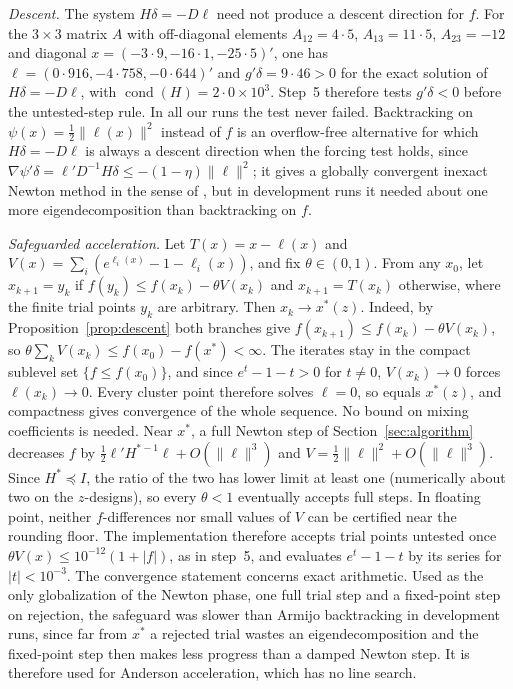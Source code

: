 \documentclass[11pt]{article}
\begin{document}
\emph{Descent.} The system $H\delta=-D\ell$ need not produce a
descent direction for $f$. For the $3\times3$ matrix $A$ with
off-diagonal elements $A_{12}=4{\cdot}5$, $A_{13}=11{\cdot}5$,
$A_{23}=-12$ and diagonal $x=(-3{\cdot}9,-16{\cdot}1,-25{\cdot}5)'$, one
has $\ell=(0{\cdot}916,-4{\cdot}758,-0{\cdot}644)'$ and
$g'\delta=9{\cdot}46>0$ for the exact solution of $H\delta=-D\ell$,
with $\operatorname{cond}(H)=2{\cdot}0\times10^{3}$. Step~5 therefore
tests $g'\delta<0$ before the untested-step rule. In all our runs the
test never failed. Backtracking on $\psi(x)=\tfrac12\|\ell(x)\|^{2}$
instead of $f$ is an overflow-free alternative for which
$H\delta=-D\ell$ is always a descent direction when the forcing test
holds, since $\nabla\psi'\delta=\ell'D^{-1}H\delta\leq-(1-\eta)\|\ell\|^{2}$;
it gives a globally convergent inexact Newton method in the sense of
\citet{EisenstatWalker:1994}, but in development runs it needed about
one more eigendecomposition than backtracking on $f$.

\emph{Safeguarded acceleration.} Let $T(x)=x-\ell(x)$ and
$V(x)=\sum_i(e^{\ell_i(x)}-1-\ell_i(x))$, and fix $\theta\in(0,1)$.
From any $x_0$, let $x_{k+1}=y_k$ if $f(y_k)\leq f(x_k)-\theta V(x_k)$
and $x_{k+1}=T(x_k)$ otherwise, where the finite trial points $y_k$
are arbitrary. Then $x_k\to x^{\ast}(z)$. Indeed, by
Proposition~\ref{prop:descent} both branches give
$f(x_{k+1})\leq f(x_k)-\theta V(x_k)$, so
$\theta\sum_kV(x_k)\leq f(x_0)-f(x^{\ast})<\infty$. The iterates stay
in the compact sublevel set $\{f\leq f(x_0)\}$, and since $e^{t}-1-t>0$
for $t\neq0$, $V(x_k)\to0$ forces $\ell(x_k)\to0$. Every cluster point
therefore solves $\ell=0$, so equals $x^{\ast}(z)$, and compactness
gives convergence of the whole sequence. No bound on mixing
coefficients is needed. Near $x^{\ast}$, a full Newton step of
Section~\ref{sec:algorithm} decreases $f$ by
$\tfrac12\ell'H^{\ast-1}\ell+O(\|\ell\|^{3})$ and
$V=\tfrac12\|\ell\|^{2}+O(\|\ell\|^{3})$. Since $H^{\ast}\preceq I$,
the ratio of the two has lower limit at least one (numerically about
two on the $z$-designs), so every $\theta<1$ eventually accepts full
steps. In floating point, neither $f$-differences nor small values of
$V$ can be certified near the rounding floor. The implementation
therefore accepts trial points untested once
$\theta V(x)\leq10^{-12}(1+|f|)$, as in step~5, and evaluates
$e^{t}-1-t$ by its series for $|t|<10^{-3}$. The convergence statement
concerns exact arithmetic. Used as the only globalization of the
Newton phase, one full trial step and a fixed-point step on rejection,
the safeguard was slower than Armijo backtracking in development runs,
since far from $x^{\ast}$ a rejected trial wastes an eigendecomposition
and the fixed-point step then makes less progress than a damped Newton
step. It is therefore used for Anderson acceleration, which has no
line search.
\end{document}
